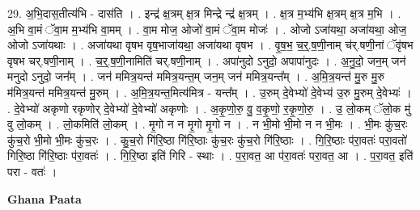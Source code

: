 \documentclass[17pt]{extarticle}
\begin{document}
29. अ॒भि॒दास॒तीत्य॑भि - दास॑ति । . इन्द्र॑ क्ष॒त्रम् क्ष॒त्र मिन्द्रे न्द्र॑ क्ष॒त्रम् । . क्ष॒त्र म॒भ्य॑भि क्ष॒त्रम् क्ष॒त्र म॒भि । . अ॒भि वा॒मं ॅवा॒म म॒भ्य॑भि वा॒मम् । . वा॒म मोज॒ ओजो॑ वा॒मं ॅवा॒म मोजः॑ । . ओजो ऽजा॑यथा॒ अजा॑यथा॒ ओज॒ ओजो ऽजा॑यथाः । . अजा॑यथा वृषभ वृष॒भाजा॑यथा॒ अजा॑यथा वृषभ । . वृ॒ष॒भ॒ च॒र्॒.ष॒णी॒नाम् च॑र्.षणी॒नां ॅवृ॑षभ वृषभ चर्.षणी॒नाम् । . च॒र्॒.ष॒णी॒नामिति॑ चर्.षणी॒नाम् । . अपा॑नुदो ऽनुदो॒ अपापा॑नुदः । . अ॒नु॒दो॒ जन॒म् जन॑ मनुदो ऽनुदो॒ जन᳚म् । . जन॑ ममित्र॒यन्त॑ ममित्र॒यन्त॒म् जन॒म् जन॑ ममित्र॒यन्त᳚म् । . अ॒मि॒त्र॒यन्त॑ मु॒रु मु॒रु म॑मित्र॒यन्त॑ ममित्र॒यन्त॑ मु॒रुम् । . अ॒मि॒त्र॒यन्त॒मित्य॑मित्र - यन्त᳚म् । . उ॒रुम् दे॒वेभ्यो॑ दे॒वेभ्य॑ उ॒रु मु॒रुम् दे॒वेभ्यः॑ । . दे॒वेभ्यो॑ अकृणो रकृणोर् दे॒वेभ्यो॑ दे॒वेभ्यो॑ अकृणोः । . अ॒कृ॒णो॒रु॒ वु॒ व॒कृ॒णो॒ र॒कृ॒णो॒रु॒ । . उ॒ लो॒कम् ॅलो॒क मु॑ वु लो॒कम् । . लो॒कमिति॑ लो॒कम् । . मृ॒गो न न मृ॒गो मृ॒गो न । . न भी॒मो भी॒मो न न भी॒मः । . भी॒मः कु॑च॒रः कु॑च॒रो भी॒मो भी॒मः कु॑च॒रः । . कु॒च॒रो गि॑रि॒ष्ठा गि॑रि॒ष्ठाः कु॑च॒रः कु॑च॒रो गि॑रि॒ष्ठाः । . गि॒रि॒ष्ठाः प॑रा॒वतः॑ परा॒वतो॑ गिरि॒ष्ठा गि॑रि॒ष्ठाः प॑रा॒वतः॑ । . गि॒रि॒ष्ठा इति॑ गिरि - स्थाः । . प॒रा॒वत॒ आ प॑रा॒वतः॑ परा॒वत॒ आ । . प॒रा॒वत॒ इति॑ परा - वतः॑ । \newline

\textbf{Ghana Paata } \newline
\end{document}

